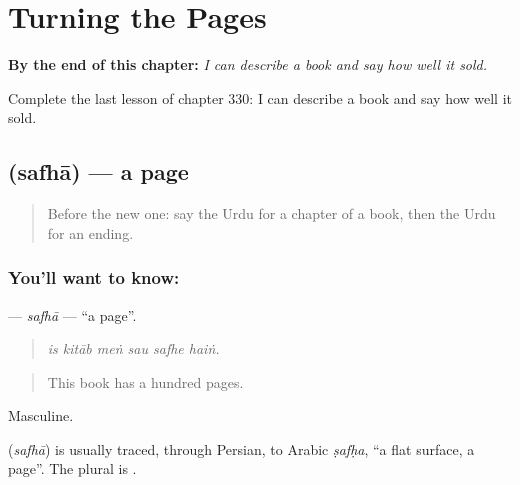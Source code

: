 
\chapter{Turning the Pages}
\label{ch:ur-turning-the-pages}

\begin{chapteropening}
\textbf{By the end of this chapter:} \emph{I can describe a book and say how well it sold.}

Complete the last lesson of chapter 330: I can describe a book and say how well it sold.
\end{chapteropening}

\section[\texorpdfstring{\ur{صفحہ} (safhā)}{صفحہ (safhā)}]{ (safhā) — a page}

\label{lesson:UR-C330-safha}



\begin{quote}
Before the new one: say the Urdu for a chapter of a book, then the Urdu for an ending.
\end{quote}

\subsection*{You'll want to know: }
\textbf{} — \emph{safhā} — \textquotedblleft{}a page\textquotedblright{}.

\begin{quote}
     
\end{quote}

\begin{quote}
\emph{is kitāb meṅ sau safhe haiṅ.}
\end{quote}

\begin{quote}
This book has a hundred pages.
\end{quote}

Masculine.

\begin{cousinweb}
\textbf{} (\emph{safhā}) is usually traced, through Persian, to Arabic \emph{ṣafḥa}, \textquotedblleft{}a flat surface, a page\textquotedblright{}. The plural is \textbf{}.
\end{cousinweb}

